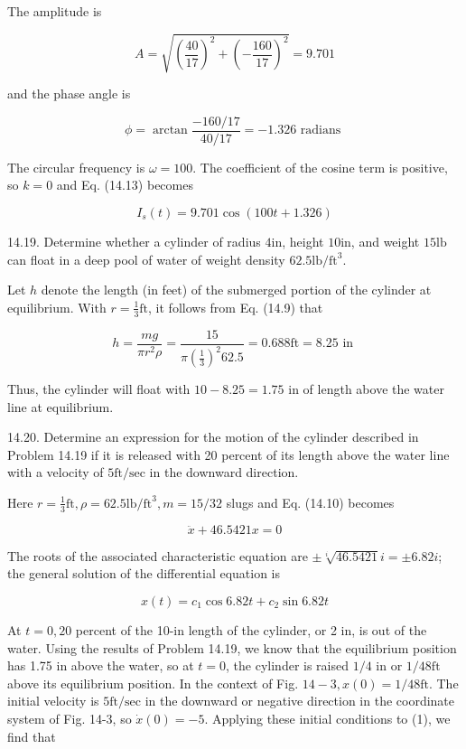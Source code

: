 \documentclass[10pt]{article}
\begin{document}
The amplitude is

$$
A=\sqrt{\left(\frac{40}{17}\right)^{2}+\left(-\frac{160}{17}\right)^{2}}=9.701
$$

and the phase angle is

$$
\phi=\arctan \frac{-160 / 17}{40 / 17}=-1.326 \text { radians }
$$

The circular frequency is $\omega=100$. The coefficient of the cosine term is positive, so $k=0$ and Eq. (14.13) becomes

$$
I_{s}(t)=9.701 \cos (100 t+1.326)
$$

14.19. Determine whether a cylinder of radius $4 \mathrm{in}$, height $10 \mathrm{in}$, and weight $15 \mathrm{lb}$ can float in a deep pool of water of weight density $62.5 \mathrm{lb} / \mathrm{ft}^{3}$.

Let $h$ denote the length (in feet) of the submerged portion of the cylinder at equilibrium. With $r=\frac{1}{3} \mathrm{ft}$, it follows from Eq. (14.9) that

$$
h=\frac{m g}{\pi r^{2} \rho}=\frac{15}{\pi\left(\frac{1}{3}\right)^{2} 62.5}=0.688 \mathrm{ft}=8.25 \text { in }
$$

Thus, the cylinder will float with $10-8.25=1.75$ in of length above the water line at equilibrium.

14.20. Determine an expression for the motion of the cylinder described in Problem 14.19 if it is released with 20 percent of its length above the water line with a velocity of $5 \mathrm{ft} / \mathrm{sec}$ in the downward direction.

Here $r=\frac{1}{3} \mathrm{ft}, \rho=62.5 \mathrm{lb} / \mathrm{ft}^{3}, m=15 / 32$ slugs and Eq. (14.10) becomes

$$
\ddot{x}+46.5421 x=0
$$

The roots of the associated characteristic equation are $\pm \sqrt[i]{46.5421} i= \pm 6.82 i$; the general solution of the differential equation is


\begin{equation*}
x(t)=c_{1} \cos 6.82 t+c_{2} \sin 6.82 t \tag{1}
\end{equation*}


At $t=0,20$ percent of the 10-in length of the cylinder, or 2 in, is out of the water. Using the results of Problem 14.19, we know that the equilibrium position has 1.75 in above the water, so at $t=0$, the cylinder is raised $1 / 4$ in or $1 / 48 \mathrm{ft}$ above its equilibrium position. In the context of Fig. $14-3, x(0)=1 / 48 \mathrm{ft}$. The initial velocity is $5 \mathrm{ft} / \mathrm{sec}$ in the downward or negative direction in the coordinate system of Fig. 14-3, so $\dot{x}(0)=-5$. Applying these initial conditions to (1), we find that
\end{document}

